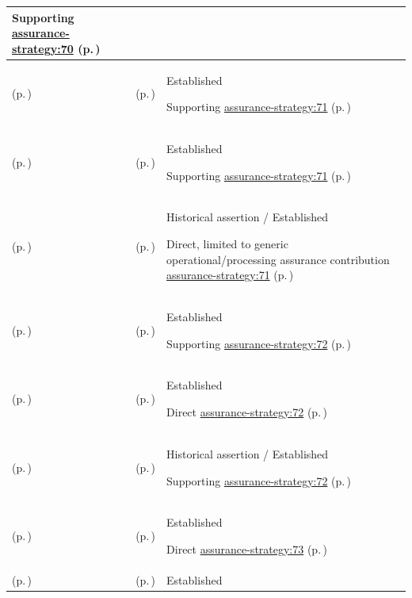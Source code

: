 \begin{longtable}{|>{\raggedright\arraybackslash}p{0.27\TableWidth}|>{\raggedright\arraybackslash}p{0.27\TableWidth}|>{\raggedright\arraybackslash}p{0.46\TableWidth}|}
Supporting \hyperref[rad:assurance-strategy:58]{assurance-strategy:70} (p.\,\pageref{rad:assurance-strategy:58})\\\hline
\nameref{cap:bec-assurance-design} (p.\,\pageref{cap:bec-assurance-design}) & \nameref{cap:ec-12} (p.\,\pageref{cap:ec-12}) & Established

Supporting \hyperref[rad:assurance-strategy:58]{assurance-strategy:71} (p.\,\pageref{rad:assurance-strategy:58})\\\hline
\nameref{cap:bec-assurance-criteria-management} (p.\,\pageref{cap:bec-assurance-criteria-management}) & \nameref{cap:ec-12} (p.\,\pageref{cap:ec-12}) & Established

Supporting \hyperref[rad:assurance-strategy:58]{assurance-strategy:71} (p.\,\pageref{rad:assurance-strategy:58})\\\hline
\nameref{cap:bec-governed-assurance} (p.\,\pageref{cap:bec-governed-assurance}) & \nameref{cap:ec-12} (p.\,\pageref{cap:ec-12}) & Historical assertion / Established

Direct, limited to generic operational/processing assurance contribution \hyperref[rad:assurance-strategy:58]{assurance-strategy:71} (p.\,\pageref{rad:assurance-strategy:58})\\\hline
\nameref{cap:bec-assurance-design} (p.\,\pageref{cap:bec-assurance-design}) & \nameref{cap:ec-13} (p.\,\pageref{cap:ec-13}) & Established

Supporting \hyperref[rad:assurance-strategy:58]{assurance-strategy:72} (p.\,\pageref{rad:assurance-strategy:58})\\\hline
\nameref{cap:bec-assurance-criteria-management} (p.\,\pageref{cap:bec-assurance-criteria-management}) & \nameref{cap:ec-13} (p.\,\pageref{cap:ec-13}) & Established

Direct \hyperref[rad:assurance-strategy:58]{assurance-strategy:72} (p.\,\pageref{rad:assurance-strategy:58})\\\hline
\nameref{cap:bec-governed-assurance} (p.\,\pageref{cap:bec-governed-assurance}) & \nameref{cap:ec-13} (p.\,\pageref{cap:ec-13}) & Historical assertion / Established

Supporting \hyperref[rad:assurance-strategy:58]{assurance-strategy:72} (p.\,\pageref{rad:assurance-strategy:58})\\\hline
\nameref{cap:bec-assurance-design} (p.\,\pageref{cap:bec-assurance-design}) & \nameref{cap:ec-14} (p.\,\pageref{cap:ec-14}) & Established

Direct \hyperref[rad:assurance-strategy:58]{assurance-strategy:73} (p.\,\pageref{rad:assurance-strategy:58})\\\hline
\nameref{cap:bec-assurance-criteria-management} (p.\,\pageref{cap:bec-assurance-criteria-management}) & \nameref{cap:ec-14} (p.\,\pageref{cap:ec-14}) & Established


\end{longtable}
